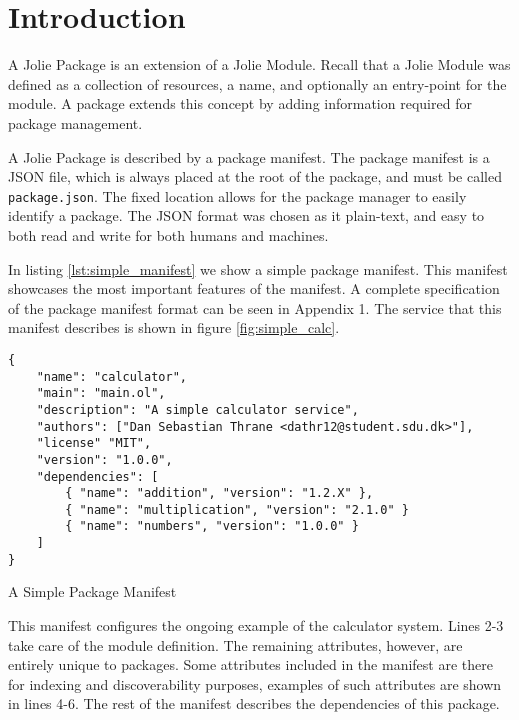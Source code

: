 \section{Introduction}

A Jolie Package is an extension of a Jolie Module. Recall that a Jolie Module
was defined as a collection of resources, a name, and optionally an entry-point
for the module. A package extends this concept by adding information required
for package management. %

A Jolie Package is described by a package manifest. The package manifest is a
JSON file, which is always placed at the root of the package, and must be
called \verb!package.json!. The fixed location allows for the package manager
to easily identify a package. The JSON format was chosen as it plain-text, and
easy to both read and write for both humans and machines.

In listing \ref{lst:simple_manifest} we show a simple package manifest. This
manifest showcases the most important features of the manifest. A complete
specification of the package manifest format can be seen in Appendix 1. The
service that this manifest describes is shown in figure \ref{fig:simple_calc}.

\begin{listing}[H]
\begin{verbatim}
{
    "name": "calculator",
    "main": "main.ol",
    "description": "A simple calculator service",
    "authors": ["Dan Sebastian Thrane <dathr12@student.sdu.dk>"],
    "license" "MIT",
    "version": "1.0.0",
    "dependencies": [
        { "name": "addition", "version": "1.2.X" },
        { "name": "multiplication", "version": "2.1.0" }
        { "name": "numbers", "version": "1.0.0" }
    ]
}
\end{verbatim}
\caption{A Simple Package Manifest}
\label{lst:simple_manifest}
\end{listing}

This manifest configures the ongoing example of the calculator system.
Lines 2-3 take care of the module definition. The remaining attributes,
however, are entirely unique to packages. Some attributes included in the
manifest are there for indexing and discoverability purposes, examples of such
attributes are shown in lines 4-6. The rest of the manifest describes the
dependencies of this package.


